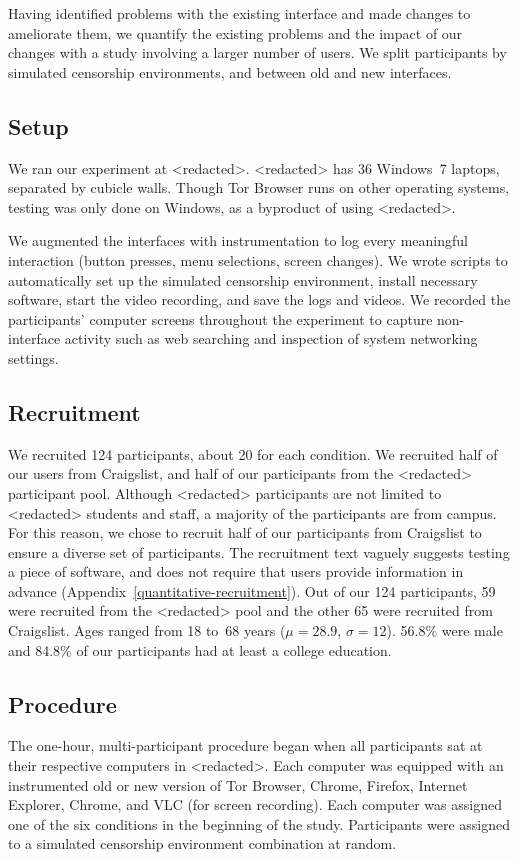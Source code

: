 \documentclass[USenglish,oneside,twocolumn]{article}
\begin{document}
{\color {red} 
Having identified problems with the existing interface
and made changes to ameliorate them,
we quantify the existing problems
and the impact of our changes with a study involving a larger number of users.
We split participants by simulated censorship environments,
and between old and new interfaces.

\subsection{Setup}
We ran our experiment at <redacted>.
<redacted> %
has 36 Windows~7 laptops, separated by cubicle walls. 
Though Tor Browser runs on other operating systems,
testing was only done on Windows, as a byproduct of using <redacted>. %

We augmented the interfaces with instrumentation 
to log every meaningful interaction
(button presses, menu selections, screen changes).
We wrote scripts to automatically set up the simulated censorship environment, install necessary software, 
start the video recording, and save the logs and videos.
We recorded the participants' computer screens
throughout the experiment to capture non-interface activity such as 
web searching and inspection of system networking settings.

\subsection{Recruitment}
We recruited 124 participants, about 20 for each
condition. We recruited half of our users from Craigslist, and half of our participants from 
the <redacted> %
participant pool. Although <redacted> %
participants are not limited to <redacted> %
students and staff,
a majority of the participants are from campus. For this reason, we chose to recruit 
half of our participants from Craigslist to ensure a diverse set of participants. 
The recruitment text vaguely suggests testing a piece of software, and does not require
that users provide information in advance (Appendix~\ref{quantitative-recruitment}). 
Out of our 124 participants, 59 were recruited from the <redacted> %
pool and the other 65 were
recruited from Craigslist. Ages ranged from 18 to~68 years
($\mu = 28.9$, $\sigma = 12$). 56.8\% were male and 
84.8\% of our participants had at least a college education.

\subsection{Procedure}
The one-hour, multi-participant procedure began when all participants sat at their
respective computers in <redacted>. %
Each computer was equipped with an instrumented old or new version
of Tor Browser, Chrome, Firefox, Internet Explorer,  Chrome, and VLC (for screen recording).
Each computer was assigned one of the six conditions in the beginning of the study. Participants
were assigned to a simulated censorship environment combination at random. 

}
\end{document}
